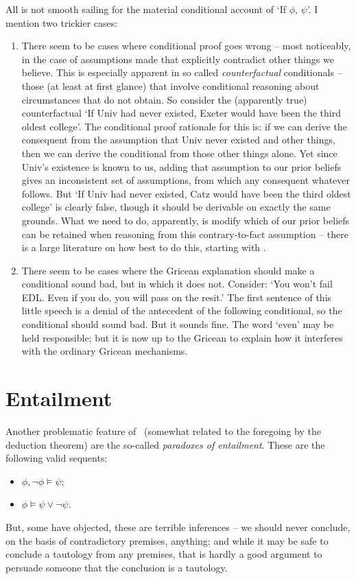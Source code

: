 All is not smooth sailing for the material conditional account of `If $\phi$, $\psi$'. I mention two trickier cases: \begin{enumerate}
	\item There seem to be cases where conditional proof goes wrong – most noticeably, in the case of assumptions made that explicitly contradict other things we believe. This is especially apparent in so called \emph{counterfactual} conditionals – those (at least at first glance) that involve conditional reasoning about circumstances that do not obtain. So consider the (apparently true) counterfactual `If Univ had never existed, Exeter would have been the third oldest college'. The conditional proof rationale for this is: if we can derive the consequent from the assumption that Univ never existed and other things, then we can derive the conditional from those other things alone. Yet since Univ's existence is known to us, adding that assumption to our prior beliefs gives an inconsistent set of assumptions, from which any consequent whatever follows. But `If Univ had never existed, Catz would have been the third oldest college' is clearly false, though it should be derivable on exactly the same grounds. What we need to do, apparently, is modify which of our prior beliefs can be retained when reasoning from this contrary-to-fact assumption – there is a large literature on how best to do this, starting with \citet{lewcount}.
\item There seem to be cases where the Gricean explanation should make a conditional sound bad, but in which it does not. Consider: `You won't fail EDL. Even if you do, you will pass on the resit.' The first sentence of this little speech is a denial of the antecedent of the following conditional, so the conditional should sound bad. But it sounds fine. The word `even' may be held responsible; but it is now up to the Gricean to explain how it interferes with the ordinary Gricean mechanisms.
\end{enumerate}


\section{Entailment}

Another problematic feature of \lone\ (somewhat related to the foregoing by the deduction theorem) are the so-called \emph{paradoxes of entailment}. These are the following valid sequents: \begin{itemize}
	\item $\phi, \neg\phi \vDash \psi$;
	\item $\phi \vDash \psi \vee \neg \psi$.
\end{itemize}
But, some have objected, these are terrible inferences – we should never conclude, on the basis of contradictory premises, anything; and while it may be safe to conclude a tautology from any premises, that is hardly a good argument to persuade someone that the conclusion is a tautology. 

